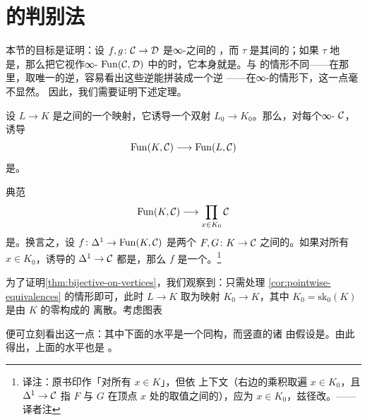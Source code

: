 \section{\trNaturalEquivalence{}的\trPointwise{}判别法}
\label{sec:pointwise-criterion}

本节的目标是证明：设 $f, g\colon \mathcal{C} \to \mathcal{D}$ 是∞-\trCategories{}之间的%
\trFunctor{}，而 $\tau$ 是其间的\trNaturalTransformation{}；如果 $\tau$ \trPointwise{}地
是\trEquivalence{}，那么把它视作\trFunctor{}∞-\trCategory{}%
$\mathrm{Fun}(\mathcal{C}, \mathcal{D})$ 中的\trMorphism{}时，它本身就是\trEquivalence{}。与%
\trOrdinaryCategory{}的情形不同——在那里，\trPointwise{}取唯一的逆，容易看出这些逆能拼装成一个逆%
\trNaturalTransformation{}——在∞-\trCategories{}的情形下，这一点毫不显然。
因此，我们需要证明下述定理。

\begin{theorem}\label{thm:bijective-on-vertices}
设 $L \to K$ 是\trSimplicialSets{}之间的一个映射，它诱导一个双射
$L_0 \to K_0$。那么，对每个∞-\trCategory{} $\mathcal{C}$，诱导\trFunctor{}%
\[
\mathrm{Fun}(K, \mathcal{C}) \longrightarrow \mathrm{Fun}(L, \mathcal{C})
\]
是\trConservative。
\end{theorem}

\begin{corollary}\label{cor:pointwise-equivalences}
典范\trFunctor{}%
\[
\mathrm{Fun}(K, \mathcal{C}) \longrightarrow \prod_{x \in K_0} \mathcal{C}
\]
是\trConservative。换言之，设 $f\colon \Delta^1 \to \mathrm{Fun}(K, \mathcal{C})$ 是两个%
\trFunctor{} $F, G\colon K \to \mathcal{C}$ 之间的\trNaturalTransformation{}。如果对所有
$x \in K_0$，诱导的\trMorphism{} $\Delta^1 \to \mathcal{C}$ 都是\trEquivalence{}，那么
$f$ 是一个\trEquivalence{}。\footnote{译注：原书印作「对所有 $x \in K$」，但依
上下文（右边的乘积取遍 $x \in K_0$，且 $\Delta^1 \to \mathcal{C}$ 指 $F$ 与 $G$ 在顶点
$x$ 处的取值之间的\trMorphism{}），应为 $x \in K_0$，兹径改。——译者注}
\end{corollary}

为了证明\cref{thm:bijective-on-vertices}，我们观察到：只需处理%
\cref{cor:pointwise-equivalences} 的情形即可，此时 $L \to K$ 取为映射
$K_0 \to K$，其中 $K_0 = \mathrm{sk}_0(K)$ 是由 $K$ 的零\trSimplex{}构成的
离散\trSimplicialSet{}。考虑图表
\begin{center}
\end{center}
便可立刻看出这一点：其中下面的水平\trFunctor{}是一个同构，而竖直的诸%
\trFunctor{}由假设是\trConservative。由此得出，上面的水平\trFunctor{}也是%
\trConservative。


